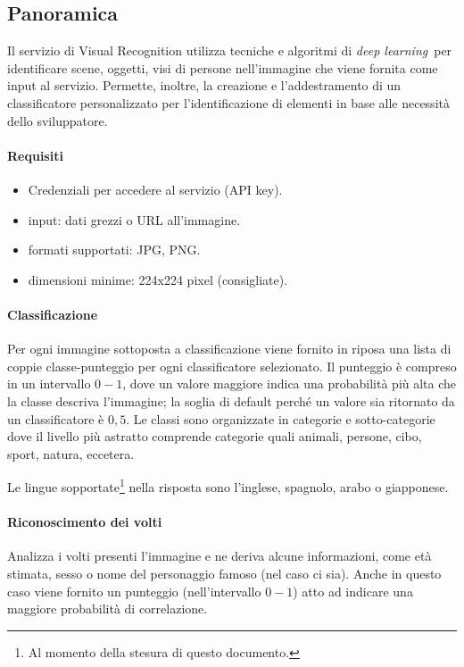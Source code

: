 \documentclass[fleqn,a4paper,11pt]{report}
\begin{document}
\subsection{Panoramica}
Il servizio di Visual Recognition\cite{ibm-api} utilizza tecniche e algoritmi di \textit{deep learning} per identificare scene, oggetti, visi di persone nell'immagine che viene fornita come input al servizio. Permette, inoltre, la creazione e l'addestramento di un classificatore personalizzato per l'identificazione di elementi in base alle necessità dello sviluppatore.

\paragraph{Requisiti}
\begin{itemize}
\item Credenziali per accedere al servizio (API key).
\item input: dati grezzi o URL all'immagine.
\item formati supportati: JPG, PNG.
\item dimensioni minime: 224x224 pixel (consigliate).
\end{itemize}

\paragraph{Classificazione} Per ogni immagine sottoposta a classificazione viene fornito in riposa una lista di coppie classe-punteggio per ogni classificatore selezionato. Il punteggio è compreso in un intervallo $0-1$, dove un valore maggiore indica una probabilità più alta che la classe descriva l'immagine; la soglia di default perché un valore sia ritornato da un classificatore è $0,5$.
Le classi sono organizzate in categorie e sotto-categorie dove il livello più astratto comprende categorie quali animali, persone, cibo, sport, natura, eccetera.

Le lingue sopportate\footnote{Al momento della stesura di questo documento.} nella risposta sono l'inglese, spagnolo, arabo o giapponese. 

\paragraph{Riconoscimento dei volti} Analizza i volti presenti l'immagine e ne deriva alcune informazioni, come età stimata, sesso o nome del personaggio famoso (nel caso ci sia). Anche in questo caso viene fornito un punteggio (nell'intervallo $0-1$) atto ad indicare una maggiore probabilità di correlazione.
\end{document}
